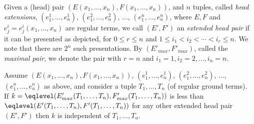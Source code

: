 \documentclass[12pt]{article}
\begin{document}
\noindent
\begin{minipage}{0.6\textwidth}
Given a (head) pair
$(E(x_1,\dots,x_n), F(x_1,\dots,x_n))$, and 
$n$ tuples, called  \emph{head extensions}, 
$(e^1_1,\dots,e^1_n)$, $(e^2_1,\dots,e^2_n)$, $\dots$, 
$(e^n_1,\dots,e^n_n)$, where $E,F$ and 
$e^i_j= e^i_j(x_1,\dots,x_n)$ are regular terms, 
we call $(E',F')$ an \emph{extended head pair} if 
it can be presented as depicted, 
for $0\leq r\leq n$ and $1\leq i_1<i_2<\cdots < i_r\leq n$.
We note that there are $2^n$ such presentations.
By $(E'_{max},F'_{max})$, called the \emph{maximal pair},
we denote
the pair with $r=n$ and $i_1=1, i_2=2, \dots, i_n=n$.
\end{minipage}
\begin{minipage}{0.4\textwidth}
\begin{center}
\end{center}
\end{minipage}

\begin{prop}\label{prop:afixedpair}
Assume  
$(E(x_1,\dots,x_n), F(x_1,\dots,x_n))$, 
$(e^1_1,\dots,e^1_n)$, $(e^2_1,\dots,e^2_n)$, $\dots$, 
$(e^n_1,\dots,e^n_n)$ as above, 
and consider a tuple  $T_1,\dots,T_n$ (of regular ground
terms).
\\
If $k=\eqlevel(E'_{max}(T_1,\dots,T_n),F'_{max}(T_1,\dots,T_n))$ is
less than 
\\
$\eqlevel(E'(T_1,\dots,T_n),F'(T_1,\dots,T_n))$
for any other extended head pair $(E',F')$ then 
$k$ is independent of  $T_1,\dots,T_n$.
\end{prop}
\end{document}
